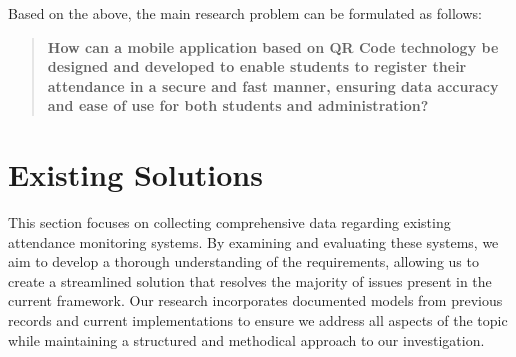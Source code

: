 \documentclass[12pt,a4paper]{report}
\begin{document}
Based on the above, the main research problem can be formulated as follows:
\begin{quote}
\textbf{How can a mobile application based on QR Code technology be designed and developed to enable students to register their attendance in a secure and fast manner, ensuring data accuracy and ease of use for both students and administration?}
\end{quote}


\section{Existing Solutions}
This section focuses on collecting comprehensive data regarding existing attendance monitoring systems. By examining and evaluating these systems, we aim to develop a thorough understanding of the requirements, allowing us to create a streamlined solution that resolves the majority of issues present in the current framework. Our research incorporates documented models from previous records and current implementations to ensure we address all aspects of the topic while maintaining a structured and methodical approach to our investigation.
\vspace{5cm}
\end{document}

